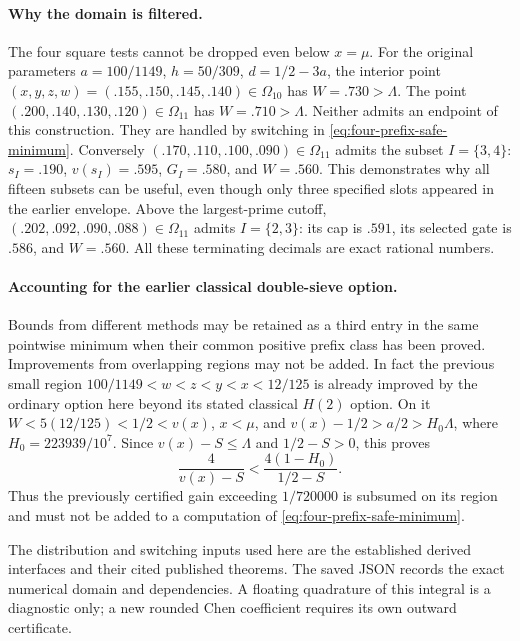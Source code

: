 \paragraph{Why the domain is filtered.}
The four square tests cannot be dropped even below $x=\mu$.
For the original parameters $a=100/1149$, $h=50/309$,
$d=1/2-3a$, the interior point
$(x,y,z,w)=(.155,.150,.145,.140)\in\Omega_{10}$ has
$W=.730>\Lambda$.
The point $(.200,.140,.130,.120)\in\Omega_{11}$ has
$W=.710>\Lambda$.  Neither admits an endpoint of this construction.
They are handled by switching in \eqref{eq:four-prefix-safe-minimum}.
Conversely $(.170,.110,.100,.090)\in\Omega_{11}$ admits the
subset $I=\{3,4\}$: $s_I=.190$, $v(s_I)=.595$,
$G_I=.580$, and $W=.560$.  This demonstrates why all fifteen
subsets can be useful, even though only three specified slots
appeared in the earlier envelope.  Above the largest-prime cutoff,
$(.202,.092,.090,.088)\in\Omega_{11}$ admits $I=\{2,3\}$:
its cap is $.591$, its selected gate is $.586$, and $W=.560$.
All these terminating decimals are exact rational numbers.

\paragraph{Accounting for the earlier classical double-sieve option.}
Bounds from different methods may be retained as a third entry in
the same pointwise minimum when their common positive prefix class
has been proved.  Improvements from overlapping regions may not
be added.  In fact the previous small region
$100/1149<w<z<y<x<12/125$ is already improved by the ordinary
option here beyond its stated classical $H(2)$ option.  On it
$W<5(12/125)<1/2<v(x)$, $x<\mu$, and
$v(x)-1/2>a/2>H_0\Lambda$, where $H_0=223939/10^7$.
Since $v(x)-S\le\Lambda$ and $1/2-S>0$, this proves
\[
 \frac4{v(x)-S}
 <\frac{4(1-H_0)}{1/2-S}.
\]
Thus the previously certified gain exceeding $1/720000$ is
subsumed on its region and must not be added to a computation of
\eqref{eq:four-prefix-safe-minimum}.

The distribution and switching inputs used here are the established
derived interfaces and their cited published theorems.  The saved
JSON records the exact numerical domain and dependencies.  A
floating quadrature of this integral is a diagnostic only; a new
rounded Chen coefficient requires its own outward certificate.
